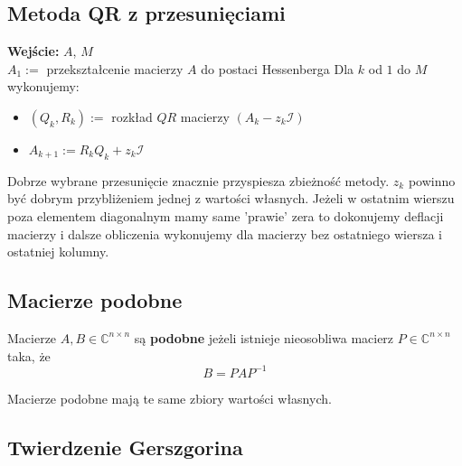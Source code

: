 \documentclass[../mn-notatki.tex]{subfiles}
\begin{document}
\subsection{Metoda QR z przesunięciami}

\begin{tcolorbox}
\textbf{Wejście:} $A$, $M$ \\
$A_1 := $ przekształcenie macierzy $A$ do postaci Hessenberga
Dla $k$ od $1$ do $M$ wykonujemy:
\begin{itemize}
    \item $(Q_k, R_k) := $ rozkład $QR$ macierzy $(A_k - z_k\mathcal{I})$
    \item $A_{k + 1} := R_kQ_k + z_k\mathcal{I}$
\end{itemize}
\end{tcolorbox}

Dobrze wybrane przesunięcie znacznie przyspiesza zbieżność metody.
$z_k$ powinno być dobrym przybliżeniem jednej z wartości własnych.
Jeżeli w ostatnim wierszu poza elementem diagonalnym mamy same 'prawie' zera
to dokonujemy deflacji macierzy i dalsze obliczenia wykonujemy dla macierzy
bez ostatniego wiersza i ostatniej kolumny.

\subsection{Macierze podobne}

\begin{tcolorbox}
Macierze $A, B \in \mathbb{C}^{n \times n}$ są \textbf{podobne} jeżeli
istnieje nieosobliwa macierz $P \in \mathbb{C}^{n \times n}$ taka, że
\[
B = P A P^{-1}
\]
\end{tcolorbox}

\begin{tcolorbox}
Macierze podobne mają te same zbiory wartości własnych.
\end{tcolorbox}


\subsection{Twierdzenie Gerszgorina}
\end{document}
